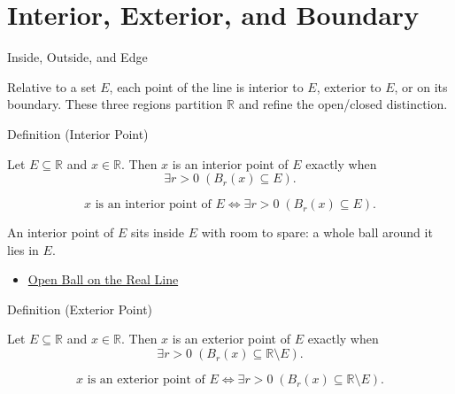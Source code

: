 \section{Interior, Exterior, and Boundary}
\label{sec:interior-exterior-boundary}

\begin{topicbox}{Inside, Outside, and Edge}
\begin{exposition}
Relative to a set $E$, each point of the line is interior to $E$, exterior to $E$, or on its boundary. These three regions partition $\mathbb{R}$ and refine the open/closed distinction.
\end{exposition}
\end{topicbox}
\begin{definitionbox}{Definition (Interior Point)}
\begin{definition}
\label{def:interior-point}
Let $E\subseteq\mathbb{R}$ and $x\in\mathbb{R}$. Then $x$ is an interior point of $E$ exactly when
\[
\exists r>0\;(B_{r}(x)\subseteq E).
\]
\end{definition}
\end{definitionbox}
\begin{remark*}
\[
x \text{ is an interior point of } E \Longleftrightarrow \exists r>0\;(B_{r}(x)\subseteq E).
\]
\end{remark*}
\begin{remark*}[Interpretation]
An interior point of $E$ sits inside $E$ with room to spare: a whole ball around it lies in $E$.
\end{remark*}
\begin{dependencies}
\begin{itemize}
  \item \hyperref[def:open-ball]{Open Ball on the Real Line}
\end{itemize}
\end{dependencies}
\begin{definitionbox}{Definition (Exterior Point)}
\begin{definition}
\label{def:exterior-point}
Let $E\subseteq\mathbb{R}$ and $x\in\mathbb{R}$. Then $x$ is an exterior point of $E$ exactly when
\[
\exists r>0\;(B_{r}(x)\subseteq \mathbb{R}\setminus E).
\]
\end{definition}
\end{definitionbox}
\begin{remark*}
\[
x \text{ is an exterior point of } E \Longleftrightarrow \exists r>0\;(B_{r}(x)\subseteq \mathbb{R}\setminus E).
\]
\end{remark*}
